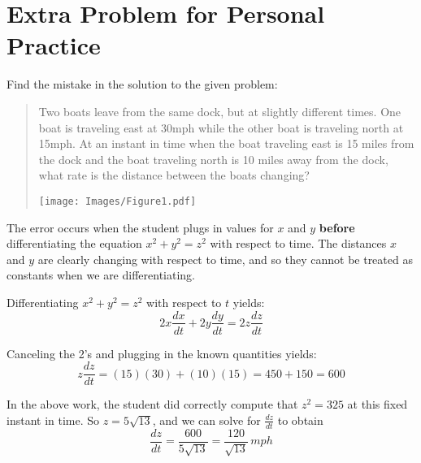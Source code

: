 \documentclass[nooutcomes]{ximera}
\renewenvironment{freeResponse}{
\ifhandout\setbox0\vbox\bgroup\else
\begin{trivlist}\item[\hskip \labelsep\bfseries Solution:\hspace{2ex}]
\fi}
{\ifhandout\egroup\else
\end{trivlist}
\fi}
\newcommand{\dd}[2][]{\frac{d #1}{d #2}}
\newcommand{\dfn}{\textbf}
\begin{document}
\section{Extra Problem for Personal Practice}
\begin{problem}
  Find the mistake in the solution to the given problem:

  \begin{quote}
    Two boats leave from the same dock, but at slightly different
    times.  One boat is traveling east at 30mph while the other boat
    is traveling north at 15mph.  At an instant in time when the boat
    traveling east is 15 miles from the dock and the boat traveling
    north is 10 miles away from the dock, what rate is the distance
    between the boats changing?
    \begin{image}
      \texttt{[image: Images/Figure1.pdf]}
    \end{image}
  \end{quote}
		\begin{freeResponse}
		The error occurs when the student plugs in values for $x$ and $y$ \dfn{before} differentiating the equation $x^2 + y^2 = z^2$ with respect to time.  The distances $x$ and $y$ are clearly changing with respect to time, and so they cannot be treated as constants when we are differentiating.
		
		Differentiating $x^2 + y^2 = z^2$ with respect to $t$ yields:
		$$ 2x \dd[x]{t} + 2y \dd[y]{t} = 2z \dd[z]{t}$$
		
		Canceling the 2's and plugging in the known quantities yields:
		$$ z \dd[z]{t} = (15)(30) + (10)(15) = 450 + 150 = 600 $$
		
		In the above work, the student did correctly compute that $z^2 = 325$ at this fixed instant in time.  So $z = 5\sqrt{13}$, and we can solve for $\dd[z]{t}$ to obtain
		$$ \dd[z]{t} = \frac{600}{5 \sqrt{13}} = \frac{120}{\sqrt{13}} \, mph $$
		\end{freeResponse}	

\end{problem}
	
\end{document}
